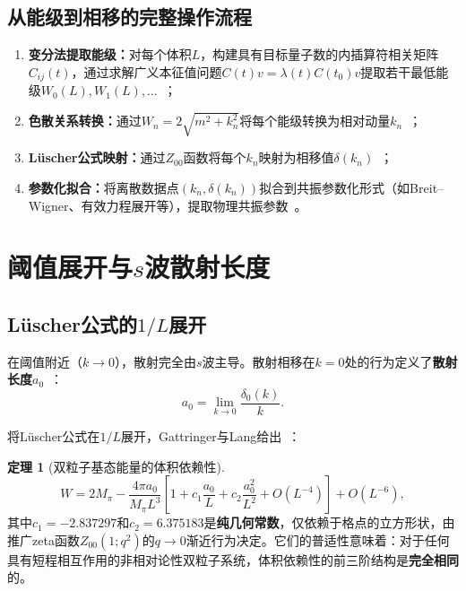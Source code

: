 \documentclass[12pt,a4paper]{ctexart}
\theoremstyle{definition}
\newtheorem{theorem}{定理}[section]
\begin{document}
\subsection{从能级到相移的完整操作流程}

\begin{enumerate}[leftmargin=*]
    \item \textbf{变分法提取能级：}对每个体积$L$，构建具有目标量子数的内插算符相关矩阵$C_{ij}(t)$，通过求解广义本征值问题$C(t)v = \lambda(t) C(t_0) v$提取若干最低能级$W_0(L), W_1(L), \ldots$~\cite{hadronSpectroscopy2026,GattringerLang2010}；
    \item \textbf{色散关系转换：}通过$W_n = 2\sqrt{m^2 + k_n^2}$将每个能级转换为相对动量$k_n$~\cite{dispersion2026}；
    \item \textbf{L\"uscher公式映射：}通过$Z_{00}$函数将每个$k_n$映射为相移值$\delta(k_n)$~\cite{GattringerLang2010}；
    \item \textbf{参数化拟合：}将离散数据点$(k_n, \delta(k_n))$拟合到共振参数化形式（如Breit--Wigner、有效力程展开等），提取物理共振参数~\cite{decayChannels2026}。
\end{enumerate}

\section{阈值展开与$s$波散射长度}

\subsection{L\"uscher公式的$1/L$展开}

在阈值附近（$k \to 0$），散射完全由$s$波主导。散射相移在$k=0$处的行为定义了\textbf{散射长度}$a_0$~\cite{GattringerLang2010}：
\begin{equation}\label{eq:scattering_length_def}
    a_0 = \lim_{k \to 0} \frac{\delta_0(k)}{k}.
\end{equation}

将L\"uscher公式在$1/L$展开，Gattringer与Lang给出~\cite{GattringerLang2010}：
\begin{theorem}[双粒子基态能量的体积依赖性]\label{thm:Luscher_expand}
\begin{equation}\label{eq:Luscher_expand}
    \boxed{W = 2M_\pi - \frac{4\pi a_0}{M_\pi L^3}\left[1 + c_1\frac{a_0}{L} + c_2\frac{a_0^2}{L^2} + O(L^{-4})\right] + O(L^{-6}),}
\end{equation}
其中$c_1 = -2.837297$和$c_2 = 6.375183$是\textbf{纯几何常数}，仅依赖于格点的立方形状，由推广zeta函数$Z_{00}(1; q^2)$的$q\to 0$渐近行为决定。它们的普适性意味着：对于任何具有短程相互作用的非相对论性双粒子系统，体积依赖性的前三阶结构是\textbf{完全相同}的。
\end{theorem}
\end{document}
